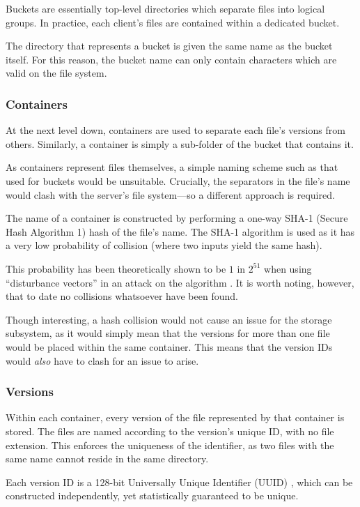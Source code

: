 Buckets are essentially top-level directories which separate files into logical
groups. In practice, each client's files are contained within a dedicated
bucket.

The directory that represents a bucket is given the same name as the bucket
itself. For this reason, the bucket name can only contain characters which are
valid on the file system.

\subsubsection{Containers}

At the next level down, containers are used to separate each file's versions
from others. Similarly, a container is simply a sub-folder of the bucket that
contains it.

As containers represent files themselves, a simple naming scheme such as that
used for buckets would be unsuitable. Crucially, the separators in the file's
name would clash with the server's file system---so a different approach is
required.

The name of a container is constructed by performing a one-way SHA-1 (Secure
Hash Algorithm 1) \cite{rfc3174} hash of the file's name. The SHA-1 algorithm
is used as it has a very low probability of collision (where two inputs yield
the same hash).

This probability has been theoretically shown to be $1$ in $2^{51}$ when using
``disturbance vectors'' in an attack on the algorithm \cite{manuelSHA}. It is
worth noting, however, that to date no collisions whatsoever have been found.

Though interesting, a hash collision would not cause an issue for the storage
subsystem, as it would simply mean that the versions for more than one file
would be placed within the same container. This means that the version IDs
would \emph{also} have to clash for an issue to arise.

\subsubsection{Versions}

Within each container, every version of the file represented by that container
is stored. The files are named according to the version's unique ID, with no
file extension. This enforces the uniqueness of the identifier, as two files
with the same name cannot reside in the same directory.

Each version ID is a 128-bit Universally Unique Identifier (UUID)
\cite{rfc4122}, which can be constructed independently, yet statistically
guaranteed to be unique.

